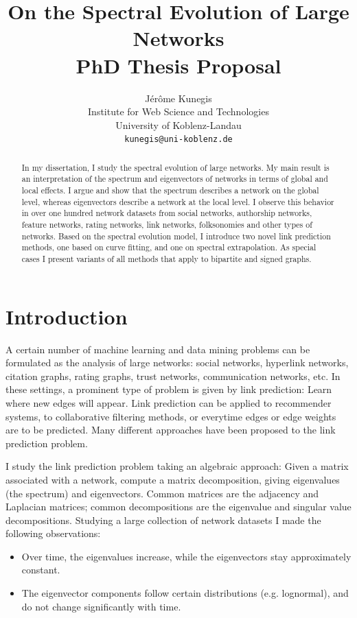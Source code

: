 \documentclass[10pt,twocolumn]{article}
\begin{document}
\sloppy

\title{
  On the Spectral Evolution of Large Networks \\ 
  PhD Thesis Proposal
}
\author {Jérôme Kunegis \\
  \small{Institute for Web Science and Technologies} \\
  \small{University of Koblenz-Landau} \\
  \texttt{kunegis@uni-koblenz.de}
}

\maketitle

\begin{abstract}
In my dissertation, I study the spectral evolution of large networks. My
main result is an interpretation of the spectrum and eigenvectors of
networks in terms of global and local effects. I argue and show that the
spectrum describes a network on the global level, whereas eigenvectors
describe a network at the local level.  I observe this behavior in over
one hundred network datasets from social networks, authorship networks,
feature networks, rating networks, link networks, folksonomies and other
types of networks.  
Based on the spectral evolution
model, I introduce two novel link prediction methods, one based on curve
fitting, and one on spectral extrapolation.  
As special cases I
present variants of all methods that apply to bipartite and signed
graphs.
\end{abstract}

\section{Introduction}
A certain number of machine learning and data mining problems
can be formulated as the analysis of large networks:  social networks,
hyperlink networks, citation graphs, rating graphs, trust networks,
communication networks, etc.  
In these settings, a prominent type of problem is given by link
prediction:  Learn where new edges will appear.  Link prediction can be
applied to recommender systems, to collaborative filtering methods, or
everytime edges or edge weights are to be predicted. 
Many different approaches have been proposed to the link prediction
problem. 

I study the link prediction problem taking an algebraic approach: Given a matrix
associated with a network, compute a matrix decomposition, giving
eigenvalues (the spectrum) and eigenvectors.  Common matrices are the
adjacency and Laplacian matrices; common decompositions are the
eigenvalue and singular value decompositions.
Studying a large collection of network datasets I made the following
observations: 
\begin{itemize}
  \item Over time, the eigenvalues increase, while the
    eigenvectors stay approximately constant.
  \item The eigenvector components follow certain distributions
    (e.g. lognormal), and do not change significantly with time. 
\end{itemize}
\end{document}
